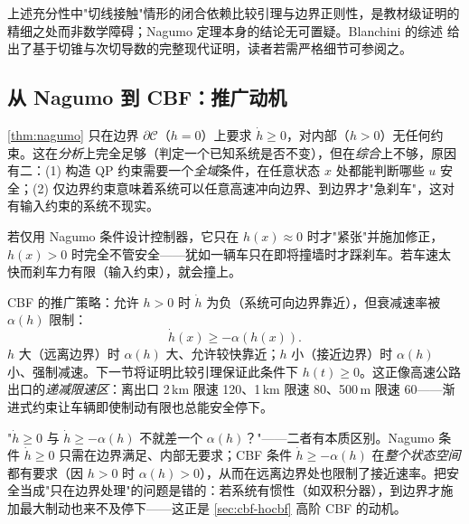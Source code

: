 \begin{remark}[证明的严谨边界]
上述充分性中"切线接触"情形的闭合依赖比较引理与边界正则性，是教材级证明的精细之处而非数学障碍；Nagumo 定理本身的结论无可置疑。Blanchini 的综述 \cite{blanchini1999survey} 给出了基于切锥与次切导数的完整现代证明，读者若需严格细节可参阅之。
\end{remark}

\subsection{从 Nagumo 到 CBF：推广动机}

\cref{thm:nagumo} 只在边界 $\partial\mathcal C$（$h=0$）上要求 $\dot h\ge0$，对内部（$h>0$）无任何约束。这在\emph{分析}上完全足够（判定一个已知系统是否不变），但在\emph{综合}上不够，原因有二：(1) 构造 QP 约束需要一个\emph{全域}条件，在任意状态 $x$ 处都能判断哪些 $u$ 安全；(2) 仅边界约束意味着系统可以任意高速冲向边界、到边界才"急刹车"，这对有输入约束的系统不现实。

\begin{insight}
若仅用 Nagumo 条件设计控制器，它只在 $h(x)\approx0$ 时才"紧张"并施加修正，$h(x)>0$ 时完全不管安全——犹如一辆车只在即将撞墙时才踩刹车。若车速太快而刹车力有限（输入约束），就会撞上。
\end{insight}

CBF 的推广策略：允许 $h>0$ 时 $\dot h$ 为负（系统可向边界靠近），但衰减速率被 $\alpha(h)$ 限制：
\begin{equation}
\dot h(x)\ge-\alpha(h(x)).
\label{eq:cbf-inequality-intro}
\end{equation}
$h$ 大（远离边界）时 $\alpha(h)$ 大、允许较快靠近；$h$ 小（接近边界）时 $\alpha(h)$ 小、强制减速。下一节将证明比较引理保证此条件下 $h(t)\ge0$。这正像高速公路出口的\emph{递减限速区}：离出口 2\,km 限速 120、1\,km 限速 80、500\,m 限速 60——渐进式约束让车辆即使制动有限也总能安全停下。

\begin{pitfall}
"$\dot h\ge0$ 与 $\dot h\ge-\alpha(h)$ 不就差一个 $\alpha(h)$？"——二者有本质区别。Nagumo 条件 $\dot h\ge0$ 只需在边界满足、内部无要求；CBF 条件 $\dot h\ge-\alpha(h)$ 在\emph{整个状态空间}都有要求（因 $h>0$ 时 $\alpha(h)>0$），从而在远离边界处也限制了接近速率。把安全当成"只在边界处理"的问题是错的：若系统有惯性（如双积分器），到边界才施加最大制动也来不及停下——这正是 \cref{sec:cbf-hocbf} 高阶 CBF 的动机。
\end{pitfall}

